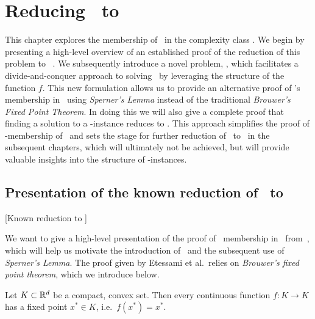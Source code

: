 \setchapterpreamble[u]{\margintoc}
\chapter{Reducing \Tarski\ to \PPAD}\label{ch:ppad_reduction}

This chapter explores the membership of \Tarski\ in the complexity class \PPAD\@. We begin by presenting a high-level overview of an established proof of the reduction of this problem to \Brouwer~\cite{etessami_tarskis_2020}. We subsequently introduce a novel problem, \Tarskistar, which facilitates a divide-and-conquer approach to solving \Tarski\ by leveraging the structure of the function $f$. This new formulation allows us to provide an alternative proof of \Tarski's membership in \PPAD\ using \textit{Sperner's Lemma} instead of the traditional \textit{Brouwer's Fixed Point Theorem}. In doing this we will also give a complete proof that finding a solution to a \Sperner-instance reduces to \EndOfLine. This approach simplifies the proof of \PPAD-membership of \Tarski\ and sets the stage for further reduction of \Tarskistar\ to \EOPL\ in the subsequent chapters, which will ultimately not be achieved, but will provide valuable insights into the structure of \Tarski-instances.

\section{Presentation of the known reduction of \Tarski\ to \PPAD}[Known reduction to \PPAD]

We want to give a high-level presentation of the proof of \Tarski\ membership in \PPAD\ from~, which will help us motivate the introduction of \Tarskistar\ and the subsequent use of \textit{Sperner's Lemma}. The proof given by Etessami et al.\ relies on \textit{Brouwer's fixed point theorem}, which we introduce below.

\begin{theorem}
	Let $K \subset \mathbb{R}^d$ be a compact, convex set. Then every continuous function $f : K \rightarrow K$ has a fixed point $x^*  \in K$, i.e.\ $f(x^*) = x^*$.
\end{theorem}

